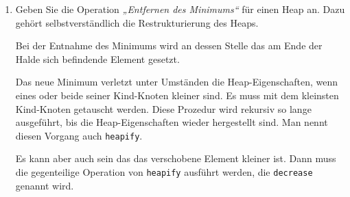 \documentclass{lehramt-informatik-haupt}
\begin{document}
\begin{enumerate}

\item Geben Sie die Operation \emph{„Entfernen des Minimums“} für einen
Heap an. Dazu gehört selbstverständlich die Restrukturierung des Heaps.

\begin{liAntwort}
Bei der Entnahme des Minimums wird an dessen Stelle das am Ende
der Halde sich befindende Element gesetzt.

Das neue Minimum verletzt unter Umständen die Heap-Eigenschaften, wenn
eines oder beide seiner Kind-Knoten kleiner sind. Es muss mit dem
kleinsten Kind-Knoten getauscht werden. Diese Prozedur wird rekursiv so
lange ausgeführt, bis die Heap-Eigenschaften wieder hergestellt sind.
Man nennt diesen Vorgang auch \texttt{heapify}.

Es kann aber auch sein das das verschobene Element kleiner ist. Dann
muss die gegenteilige Operation von \texttt{heapify} ausführt werden,
die \texttt{decrease} genannt wird.
\end{liAntwort}

\end{enumerate}
\end{document}
